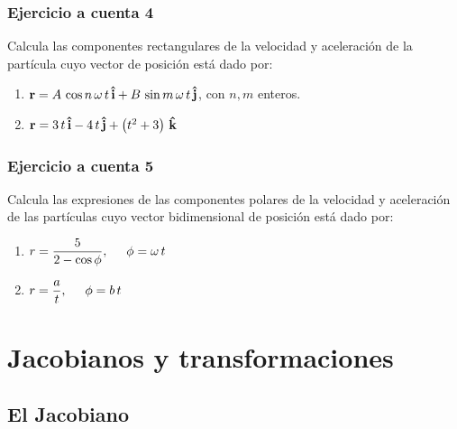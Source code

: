 \documentclass[12pt]{beamer}
\begin{document}
\begin{frame}
\frametitle{Ejercicio a cuenta 4}
Calcula las componentes rectangulares de la velocidad y aceleración de la partícula cuyo vector de posición está dado por:
\begin{enumerate}[<+->]
\item $\vb{r} = A \, \cos n \, \omega \,  t \, \vu{i} + B \, \sin m \, \omega \, t \, \vu{j}$, con $n, m$ enteros.
\item $\vb{r} = 3 \, t \, \vu{i} - 4 \, t \, \vu{j} + \left( t^{2} + 3 \right) \, \vu{k}$
\end{enumerate}
\end{frame}
\begin{frame}
\frametitle{Ejercicio a cuenta 5}
Calcula las expresiones de las componentes polares de la velocidad y aceleración de las partículas cuyo vector bidimensional de posición está dado por:
\begin{enumerate}[<+->]
\item $r = \dfrac{5}{2 - \cos \phi}, \hspace{0.5cm} \phi = \omega \, t$
\item $r = \dfrac{a}{t}, \hspace{0.5cm} \phi = b \, t$
\end{enumerate}
\end{frame}
\section{Jacobianos y transformaciones}

\subsection{El Jacobiano}
\end{document}
